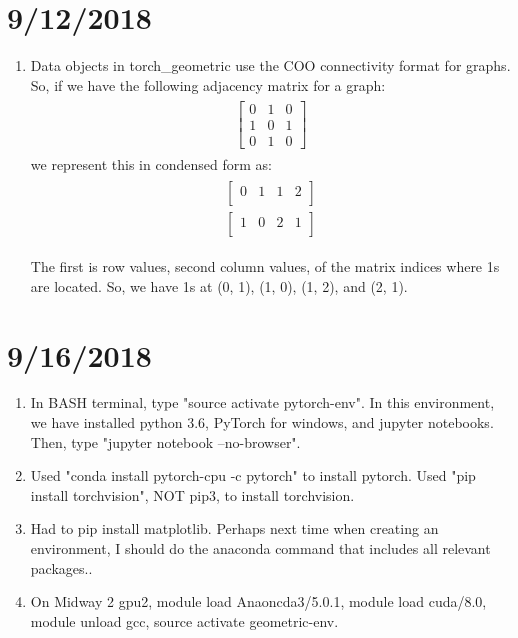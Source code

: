 \documentclass[12pt,reqno]{amsart}
\numberwithin{equation}{section}
\begin{document}
\section{9/12/2018}
\begin{enumerate}
\item Data objects in torch\_geometric use the COO connectivity format for graphs.  So, if we have the following adjacency matrix for a graph:
\begin{align}
\begin{split}
\begin{bmatrix}
0 & 1 & 0 \\
1 & 0 & 1  \\
0 & 1 & 0  
\end{bmatrix}
\end{split}
\end{align}
we represent this in condensed form as:
\begin{align}
\begin{split}
\begin{bmatrix}
0 & 1 & 1 & 2 \\
\end{bmatrix}\\
\begin{bmatrix}
1 & 0 & 2 & 1 \\
\end{bmatrix}
\end{split}
\end{align}

The first is row values, second column values, of the matrix indices where 1s are located.  So, we have 1s at (0, 1), (1, 0), (1, 2), and (2, 1).  

\end{enumerate}

\section{9/16/2018}
\begin{enumerate}
\item In BASH terminal, type "source activate pytorch-env".  In this environment, we have installed python 3.6, PyTorch for windows, and jupyter notebooks.  Then, type "jupyter notebook --no-browser".  
\item Used "conda install pytorch-cpu -c pytorch" to install pytorch.  Used "pip install torchvision", NOT pip3, to install torchvision.  
\item Had to pip install matplotlib.  Perhaps next time when creating an environment, I should do the anaconda command that includes all relevant packages..
\item On Midway 2 gpu2, module load Anaoncda3/5.0.1, module load cuda/8.0, module unload gcc, source activate geometric-env.  
\end{enumerate}
\end{document}
